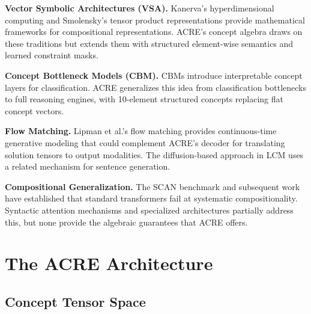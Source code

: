 \documentclass{article}
\begin{document}
\textbf{Vector Symbolic Architectures (VSA).} Kanerva's hyperdimensional computing \citep{kanerva2009hyperdimensional} and Smolensky's tensor product representations \citep{smolensky1990tensor} provide mathematical frameworks for compositional representations. ACRE's concept algebra draws on these traditions but extends them with structured element-wise semantics and learned constraint masks.

\textbf{Concept Bottleneck Models (CBM).} CBMs \citep{koh2020concept} introduce interpretable concept layers for classification. ACRE generalizes this idea from classification bottlenecks to full reasoning engines, with 10-element structured concepts replacing flat concept vectors.

\textbf{Flow Matching.} Lipman et al.'s flow matching \citep{lipman2023flow} provides continuous-time generative modeling that could complement ACRE's decoder for translating solution tensors to output modalities. The diffusion-based approach in LCM uses a related mechanism for sentence generation.

\textbf{Compositional Generalization.} The SCAN benchmark \citep{lake2018generalization} and subsequent work \citep{keysers2020measuring, kim2020cogs} have established that standard transformers fail at systematic compositionality. Syntactic attention mechanisms \citep{russin2019compositional} and specialized architectures partially address this, but none provide the algebraic guarantees that ACRE offers.

\section{The ACRE Architecture}

\subsection{Concept Tensor Space}
\end{document}
